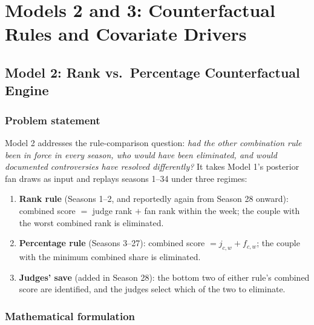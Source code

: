 \section{Models 2 and 3: Counterfactual Rules and Covariate Drivers}

\subsection{Model 2: Rank vs.\ Percentage Counterfactual Engine}\label{sec:model2}

\subsubsection{Problem statement}

Model 2 addresses the rule-comparison question: \emph{had the other combination rule
been in force in every season, who would have been eliminated, and would documented
controversies have resolved differently?} It takes Model 1's posterior fan draws as
input and replays seasons 1--34 under three regimes:
\begin{enumerate}
\item \textbf{Rank rule} (Seasons 1--2, and reportedly again from Season 28 onward):
combined score $=$ judge rank $+$ fan rank within the week; the couple with the worst
combined rank is eliminated.
\item \textbf{Percentage rule} (Seasons 3--27): combined score $= j_{c,w} + f_{c,w}$; the
couple with the minimum combined share is eliminated.
\item \textbf{Judges' save} (added in Season 28): the bottom two of either rule's
combined score are identified, and the judges select which of the two to eliminate.
\end{enumerate}

\subsubsection{Mathematical formulation}

